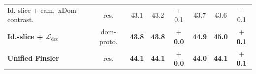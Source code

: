 \begin{table}[t]
{\begin{tabular}{@{}lc*{6}{c}@{}}
Id.-slice + cam.\ xDom contrast.                          & res. & 43.1 & 43.2 & {$+$0.1} & 43.7 & 43.6 & {$-$0.1} %
\\
\textbf{Id.-slice + $\mathcal{L}_{\mathrm{dcc}}$}                         & dom-proto.  & \textbf{43.8} & \textbf{43.8} & \textbf{$+$0.0} & \textbf{44.9} & \textbf{45.0} & \textbf{$+$0.1} %
\\
\textbf{Unified Finsler}                 & res. & \textbf{44.1} & \textbf{44.1} & \textbf{$+$0.0} & \textbf{44.0} & \textbf{44.1} & \textbf{$+$0.1} %
\\
\bottomrule
\end{tabular}%
}
\end{table}



